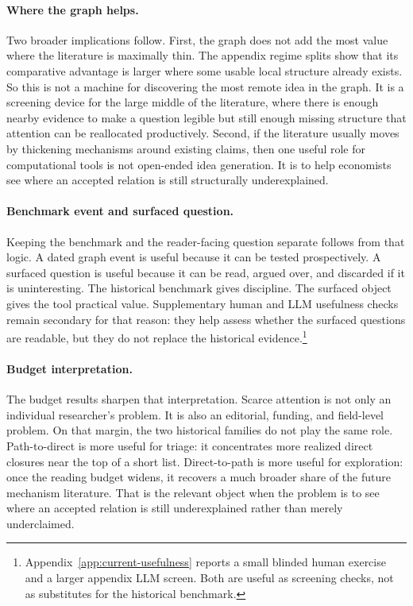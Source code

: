 \documentclass[11pt]{article}
\begin{document}
\paragraph{Where the graph helps.}
Two broader implications follow. First, the graph does not add the most value where the
literature is maximally thin. The appendix regime splits show that its comparative advantage is
larger where some usable local structure already exists. So this is not a machine for
discovering the most remote idea in the graph. It is a screening device for the large middle
of the literature, where there is enough nearby evidence to make a question legible but
still enough missing structure that attention can be reallocated productively. Second, if
the literature usually moves by thickening mechanisms around existing claims, then one
useful role for computational tools is not open-ended idea generation. It is to help
economists see where an accepted relation is still structurally underexplained.

\paragraph{Benchmark event and surfaced question.}
Keeping the benchmark and the reader-facing question separate follows from that logic. A
dated graph event is useful because it can be tested prospectively. A surfaced question is
useful because it can be read, argued over, and discarded if it is uninteresting. The
historical benchmark gives discipline. The surfaced object gives the tool practical value.
Supplementary human and LLM usefulness checks remain secondary for that reason: they help
assess whether the surfaced questions are readable, but they do not replace the historical
evidence.\footnote{Appendix~\ref{app:current-usefulness} reports a small blinded human
exercise and a larger appendix LLM screen. Both are useful as screening checks, not as
substitutes for the historical benchmark.}

\paragraph{Budget interpretation.}
The budget results sharpen that interpretation. Scarce attention is not only an individual
researcher's problem. It is also an editorial, funding, and field-level problem. On that
margin, the two historical families do not play the same role. Path-to-direct is more
useful for triage: it concentrates more realized direct closures near the top of a short
list. Direct-to-path is more useful for exploration: once the reading budget widens, it
recovers a much broader share of the future mechanism literature. That is the relevant
object when the problem is to see where an accepted relation is still underexplained rather
than merely underclaimed.
\end{document}
